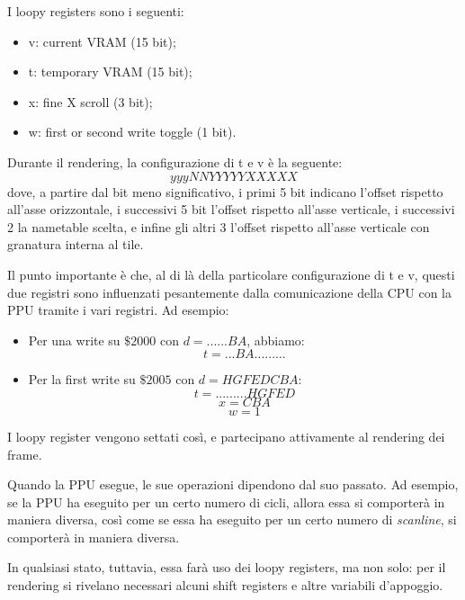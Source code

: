 \documentclass[11pt]{article}
\begin{document}
I loopy registers sono i seguenti:
\begin{itemize}
\item{
v: current VRAM (15 bit);
}
\item{
t: temporary VRAM (15 bit);
}
\item{
x: fine X scroll (3 bit);
}
\item{
w: first or second write toggle (1 bit).
}
\end{itemize}
Durante il rendering, la configurazione di t e v è la seguente:
\[
	yyyNNYYYYYXXXXX
\]
dove, a partire dal bit meno significativo, i primi 5 bit indicano l'offset rispetto all'asse orizzontale, i successivi 5 bit l'offset rispetto all'asse verticale, i successivi 2 la nametable scelta, e infine gli altri 3 l'offset rispetto all'asse verticale con granatura interna al tile.

Il punto importante è che, al di là della particolare configurazione di t e v, questi due registri sono influenzati pesantemente dalla comunicazione della CPU con la PPU tramite i vari registri. Ad esempio:
\begin{itemize}
	\item{
		Per una write su $\$2000$ con $d=......BA$, abbiamo:
		\[
			t = ...BA.........
		\]
	}
	\item{
		Per la first write su $\$2005$ con $d=HGFEDCBA$:
		\[
			t = .........HGFED
		\]
		\[
			x = CBA
		\]
		\[
			w = 1
		\]
	}
\end{itemize}
I loopy register vengono settati così, e partecipano attivamente al rendering dei frame.

Quando la PPU esegue, le sue operazioni dipendono dal suo passato. Ad esempio, se la PPU ha eseguito per un certo numero di cicli, allora essa si comporterà in maniera diversa, così come se essa ha eseguito per un certo numero di \emph{scanline}, si comporterà in maniera diversa.

In qualsiasi stato, tuttavia, essa farà uso dei loopy registers, ma non solo: per il rendering si rivelano necessari alcuni shift registers e altre variabili d'appoggio.
\end{document}
